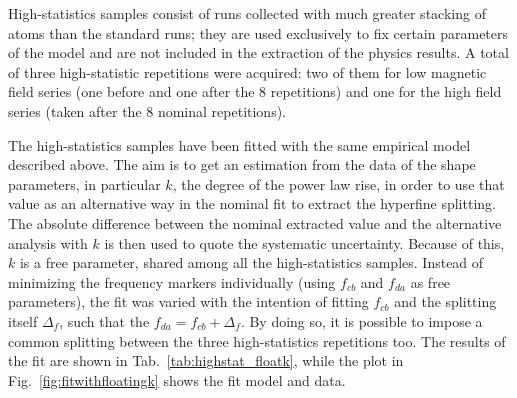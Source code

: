 High-statistics samples consist of runs collected with much greater stacking of atoms than the standard runs; they are used exclusively to fix certain parameters of the model and are not included in the extraction of the physics results. A total of three high-statistic repetitions were acquired: two of them for low magnetic field series (one before and one after the 8 repetitions) and one for the high field series (taken after the 8 nominal repetitions).

The high-statistics samples have been fitted with the same empirical model described above. The aim is to get an estimation from the data of the shape parameters, in particular $k$, the degree of the power law rise, in order to use that value as an alternative way in the nominal fit to extract the hyperfine splitting. The absolute difference between the nominal extracted value and the alternative analysis with $k$ is then used to quote the systematic uncertainty. Because of this, $k$ is a free parameter, shared among all the high-statistics samples. Instead of minimizing the frequency markers individually (using $f_{cb}$ and $f_{da}$ as free parameters), the fit was varied with the intention of fitting $f_{cb}$ and the splitting itself $\Delta_f$, such that the $f_{da} = f_{cb} + \Delta_f$. By doing so, it is possible to impose a common splitting between the three high-statistics repetitions too. The results of the fit are shown in Tab.~\ref{tab:highstat_floatk}, while the plot in Fig.~\ref{fig:fitwithfloatingk} shows the fit model and data.

